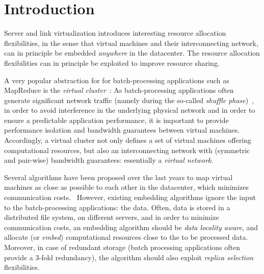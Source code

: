 \documentclass[9pt,twocolumn]{scrartcl}
\begin{document}
\section{Introduction}


Server and link virtualization introduces interesting resource allocation flexibilities,
in the sense that virtual machines and their interconnecting network,
can in principle be embedded \emph{anywhere} in the datacenter.
The resource allocation flexibilities
can in principle be exploited to improve resource sharing.

A very popular abstraction for for batch-processing applications such as MapReduce is the \emph{virtual cluster}~\cite{oktopus}:
As batch-processing applications often generate significant
network traffic (namely during the so-called \emph{shuffle phase})~\cite{amazonbw},
in order to avoid interference in the underlying physical network and in order to ensure a predictable
application performance,
it is important to provide performance isolation and bandwidth guarantees between virtual machines.~\cite{talk-about}
Accordingly, a virtual cluster not only defines a set of virtual machines offering computational resources,
but also an interconnecting network with (symmetric and pair-wise) bandwidth guarantees: essentially a \emph{virtual network}.

Several algorithms have been proposed over the last years to map virtual machines as close as possible
to each other in the datacenter, which minimizes communication costs.~\cite{oktopus,proteus}
However, existing embedding algorithms ignore the input to the batch-processing applications:
the data. Often, data is stored in a distributed file system, on different servers,
and in order to minimize
communication costs, an embedding algorithm should be \emph{data locality aware},
and allocate (or \emph{embed}) computational resources close to the to be processed data. Moreover, in case of redundant storage (batch processing
applications often provide a 3-fold redundancy), the algorithm should also exploit \emph{replica selection}
flexibilities.
\end{document}
